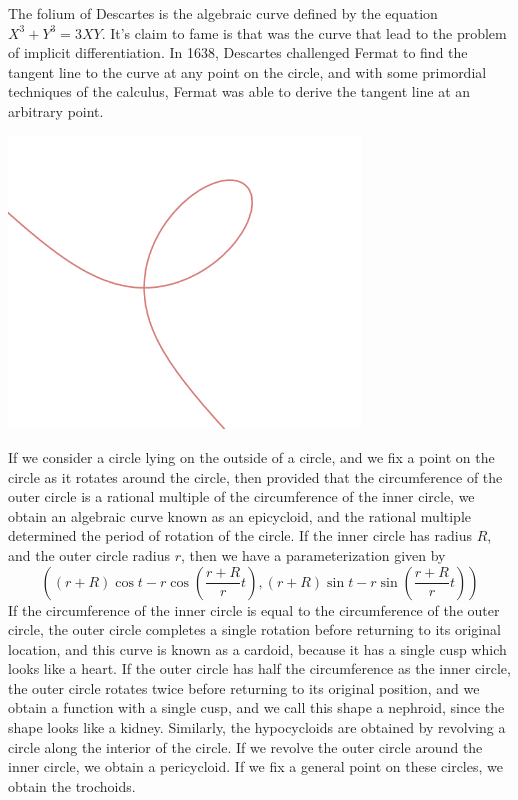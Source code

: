 \begin{example}
    The folium of Descartes is the algebraic curve defined by the equation $X^3 + Y^3 = 3XY$. It's claim to fame is that was the curve that lead to the problem of implicit differentiation. In 1638, Descartes challenged Fermat to find the tangent line to the curve at any point on the circle, and with some primordial techniques of the calculus, Fermat was able to derive the tangent line at an arbitrary point.
    \begin{center}
        \includegraphics[width=0.7\textwidth]{FoliumDescartes.png}
    \end{center}
\end{example}

\begin{example}
    If we consider a circle lying on the outside of a circle, and we fix a point on the circle as it rotates around the circle, then provided that the circumference of the outer circle is a rational multiple of the circumference of the inner circle, we obtain an algebraic curve known as an epicycloid, and the rational multiple determined the period of rotation of the circle. If the inner circle has radius $R$, and the outer circle radius $r$, then we have a parameterization given by
    \[ \left( (r + R) \cos t - r \cos \left(\frac{r + R}{r}t \right), (r + R) \sin t - r \sin \left( \frac{r + R}{r}t \right) \right) \]
    If the circumference of the inner circle is equal to the circumference of the outer circle, the outer circle completes a single rotation before returning to its original location, and this curve is known as a cardoid, because it has a single cusp which looks like a heart. If the outer circle has half the circumference as the inner circle, the outer circle rotates twice before returning to its original position, and we obtain a function with a single cusp, and we call this shape a nephroid, since the shape looks like a kidney. Similarly, the hypocycloids are obtained by revolving a circle along the interior of the circle. If we revolve the outer circle around the inner circle, we obtain a pericycloid. If we fix a general point on these circles, we obtain the trochoids.
\end{example}

